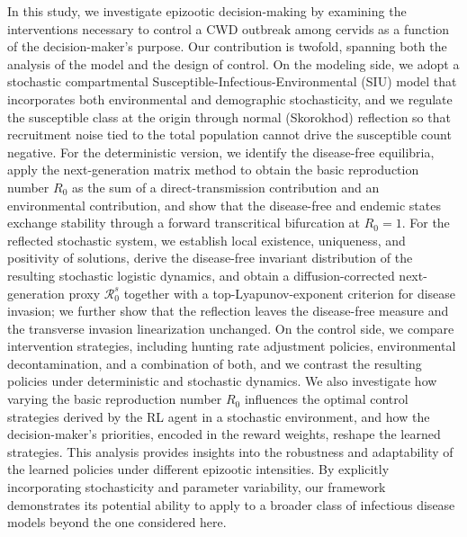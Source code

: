 \documentclass[12pt,a4paper,reqno]{amsart}
\theoremstyle{definition}
\theoremstyle{remark}
\theoremstyle{plain}
\begin{document}
In this study, we investigate epizootic decision-making by examining the interventions necessary to control a CWD outbreak among cervids as a function of the decision-maker's purpose. Our contribution is twofold, spanning both the analysis of the model and the design of control. On the modeling side, we adopt a stochastic compartmental Susceptible-Infectious-Environmental (SIU) model that incorporates both environmental and demographic stochasticity, and we regulate the susceptible class at the origin through normal (Skorokhod) reflection so that recruitment noise tied to the total population cannot drive the susceptible count negative. For the deterministic version, we identify the disease-free equilibria, apply the next-generation matrix method to obtain the basic reproduction number $R_0$ as the sum of a direct-transmission contribution and an environmental contribution, and show that the disease-free and endemic states exchange stability through a forward transcritical bifurcation at $R_0=1$. For the reflected stochastic system, we establish local existence, uniqueness, and positivity of solutions, derive the disease-free invariant distribution of the resulting stochastic logistic dynamics, and obtain a diffusion-corrected next-generation proxy $\mathcal{R}_0^s$ together with a top-Lyapunov-exponent criterion for disease invasion; we further show that the reflection leaves the disease-free measure and the transverse invasion linearization unchanged. On the control side, we compare intervention strategies, including hunting rate adjustment policies, environmental decontamination, and a combination of both, and we contrast the resulting policies under deterministic and stochastic dynamics. We also investigate how varying the basic reproduction number $R_0$ influences the optimal control strategies derived by the RL agent in a stochastic environment, and how the decision-maker's priorities, encoded in the reward weights, reshape the learned strategies. This analysis provides insights into the robustness and adaptability of the learned policies under different epizootic intensities. By explicitly incorporating stochasticity and parameter variability, our framework demonstrates its potential ability to apply to a broader class of infectious disease models beyond the one considered here.
\end{document}
